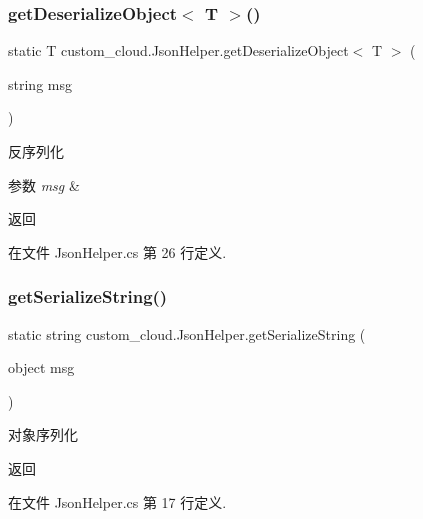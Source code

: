 \subsubsection{\texorpdfstring{get\+Deserialize\+Object$<$ T $>$()}{getDeserializeObject< T >()}}
{\footnotesize\ttfamily static T custom\+\_\+cloud.\+Json\+Helper.\+get\+Deserialize\+Object$<$ T $>$ (\begin{DoxyParamCaption}\item[{string}]{msg }\end{DoxyParamCaption})\hspace{0.3cm}{\ttfamily [static]}}



反序列化 


\begin{DoxyParams}{参数}
{\em msg} & \\
\hline
\end{DoxyParams}
\begin{DoxyReturn}{返回}

\end{DoxyReturn}


在文件 Json\+Helper.\+cs 第 26 行定义.

\mbox{\label{classcustom__cloud_1_1_json_helper_a46e5bb39af49231a36f71bb4df16905b}} 
\subsubsection{\texorpdfstring{get\+Serialize\+String()}{getSerializeString()}}
{\footnotesize\ttfamily static string custom\+\_\+cloud.\+Json\+Helper.\+get\+Serialize\+String (\begin{DoxyParamCaption}\item[{object}]{msg }\end{DoxyParamCaption})\hspace{0.3cm}{\ttfamily [static]}}



对象序列化 

\begin{DoxyReturn}{返回}

\end{DoxyReturn}


在文件 Json\+Helper.\+cs 第 17 行定义.

